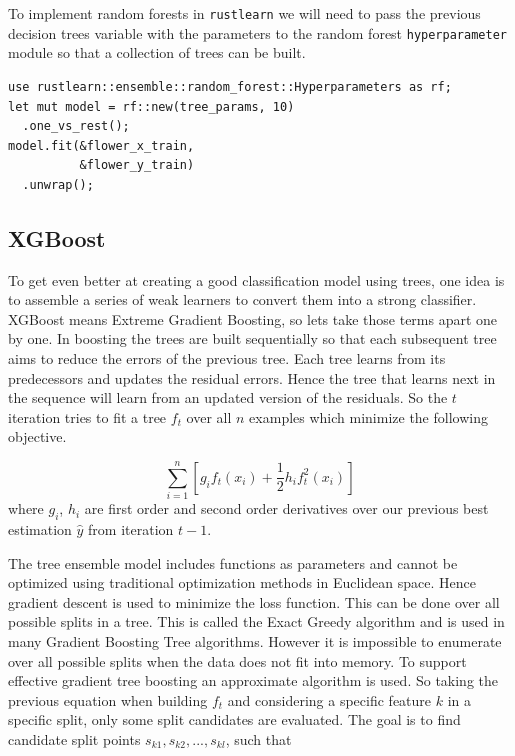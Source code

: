 \documentclass{book}
\begin{document}
To implement random forests in \lstinline{rustlearn} we will need to pass the previous decision trees variable with the parameters to the random forest \lstinline{hyperparameter} module so that a collection of trees can be built.

\begin{lstlisting}[caption={chapter3\\/rustlearn\_classification\_tasks\\/src\\/trees\\.rs}]
use rustlearn::ensemble::random_forest::Hyperparameters as rf;
let mut model = rf::new(tree_params, 10)
  .one_vs_rest();
model.fit(&flower_x_train,
          &flower_y_train)
  .unwrap();
\end{lstlisting}
\label{sub:random_forest}

\subsection{XGBoost}%
To get even better at creating a good classification model using trees, one idea is to assemble a series of weak learners to convert them into a strong classifier. XGBoost means Extreme Gradient Boosting, so lets take those terms apart one by one. In boosting the trees are built sequentially so that each subsequent tree aims to reduce the errors of the previous tree. Each tree learns from its predecessors and updates the residual errors. Hence the tree that learns next in the sequence will learn from an updated version of the residuals. So the $t$ iteration tries to fit a tree $f_t$ over all $n$ examples which minimize the following objective.

\begin{equation}
	\sum_{i=1}^{n} [g_i f_t(x_i) + \frac{1}{2}h_i f_t^2(x_i)]
\end{equation}
where $g_i$, $h_i$ are first order and second order derivatives over our previous best estimation $\hat{y}$ from iteration $t-1$.

The tree ensemble model includes functions as parameters and cannot be optimized using traditional optimization methods in Euclidean space. Hence gradient descent is used to minimize the loss function. This can be done over all possible splits in a tree. This is called the Exact Greedy algorithm and is used in many Gradient Boosting Tree algorithms. However it is impossible to enumerate over all possible splits when the data does not fit into memory. To support effective gradient tree boosting an approximate algorithm is used. So taking the previous equation when building $f_t$ and considering a specific feature $k$ in a specific split, only some split candidates are evaluated. The goal is to find candidate split points $s_{k1}, s_{k2}, ..., s_{kl}$, such that
\end{document}
